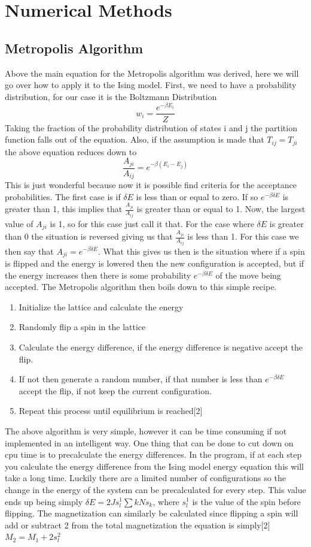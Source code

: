 \documentclass[12pt,righttag]{article}
\begin{document}
\section{Numerical Methods}
\subsection{Metropolis Algorithm}
Above the main equation for the Metropolis algorithm was derived, here we will go over how to apply it to the Ising model. First, we need to have a probability distribution, for our case it is the Boltzmann Distribution
\[w_i=\frac{e^{-\beta E_i}}{Z}\]
Taking the fraction of the probability distribution of states i and j the partition function falls out of the equation. Also, if the assumption is made that $T_{ij}=T_{ji}$ the above equation reduces down to 
\[\frac{A_{ji}}{A_{ij}}=e^{-\beta (E_i - E_j)}\]
This is just wonderful because now it is possible find criteria for the acceptance probabilities. The first case is if $\delta E$ is less than or equal to zero. If so $e^{-\beta \delta E}$ is greater than 1, this implies that $\frac{A_{ji}}{A_{ij}}$ is greater than or equal to 1. Now, the largest value of $A_{ji}$ is 1, so for this case just call it that. For the case where $\delta E$ is greater than 0 the situation is reversed giving us that $\frac{A_{ji}}{A_{ij}}$ is less than 1. For this case we then say that $A_{ji}=e^{-\beta \delta E}$. What this gives us then is the situation where if a spin is flipped and the energy is lowered then the new configuration is accepted, but if the energy increases then there is some probability $e^{-\beta \delta E}$ of the move being accepted. The Metropolis algorithm then boils down to this simple recipe.
\begin {enumerate}
\item	Initialize the lattice and calculate the energy 
\item Randomly flip a spin in the lattice 
\item Calculate the energy difference, if the energy difference is negative accept the flip. 
\item If not then generate a random number, if that number is less than $e^{-\beta \delta E}$ accept the flip, if not keep the current configuration. 
\item Repeat this process until equilibrium is reached[2]
\end {enumerate}


The above algorithm is very simple, however it can be time consuming if not implemented in an intelligent way. One thing that can be done to cut down on cpu time is to precalculate the energy differences. In the program, if at each step you calculate the energy difference from the Ising model energy equation this will take a long time. Luckily there are a limited number of configurations so the change in the energy of the system can be precalculated for every step. This value ends up being simply $\delta E=2Js_l^1\sum{k}{N}s_k$, where $s_l^1$ is the value of the spin before flipping. The magnetization can similarly be calculated since flipping a spin will add or subtract 2 from the total magnetization the equation is simply[2] $M_2=M_1+2s_l^2$
\end{document}
